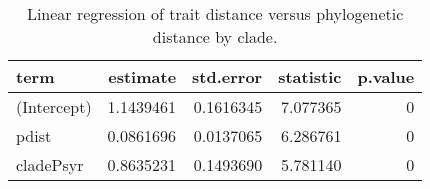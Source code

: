 \begin{table}

\caption{Linear regression of trait distance versus phylogenetic distance by clade.}
\centering
\fontsize{8}{10}\selectfont
\begin{tabular}[t]{lrrrr}
\toprule
term & estimate & std.error & statistic & p.value\\
\midrule
(Intercept) & 1.1439461 & 0.1616345 & 7.077365 & 0\\
pdist & 0.0861696 & 0.0137065 & 6.286761 & 0\\
cladePsyr & 0.8635231 & 0.1493690 & 5.781140 & 0\\
\bottomrule
\end{tabular}
\end{table}